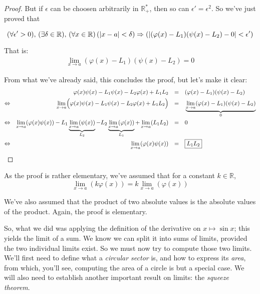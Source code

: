 \documentclass[solutions.tex]{subfiles}
\begin{document}
\begin{proof}
But if $\epsilon$ can be choosen arbitrarily in $\mathbb{R}^*_+$, then
so can $\epsilon'=\epsilon^2$. So we've just proved that

\[ \epsdelta{\epsilon'}{\delta}{a}{x}{(\varphi(x)-L_1)(\psi(x)-L_2)}{0}  \]

That is:
\begin{equation*} \begin{aligned}
	\lim_{x\rightarrow a}(\varphi(x)-L_1)(\psi(x)-L_2) = 0
\end{aligned} \end{equation*}

From what we've already said, this concludes the proof, but let's
make it clear:
\begin{equation*} \begin{aligned}
	~ && \varphi(x)\psi(x)-L_1\psi(x)-L_2\varphi(x)+L_1L_2 &&=\quad&
		(\varphi(x)-L_1)(\psi(x)-L_2) \\
	\Leftrightarrow &&
		\lim_{x\rightarrow a}\Bigl(\varphi(x)\psi(x)-L_1\psi(x)-L_2\varphi(x)+L_1L_2\Bigr) &&=\quad&
		\underbrace{\lim_{x\rightarrow a}(\varphi(x)-L_1)(\psi(x)-L_2)}_0 \\
	\Leftrightarrow &&
		\lim_{x\rightarrow a}(\varphi(x)\psi(x))
		-L_1\underbrace{\lim_{x\rightarrow a}(\psi(x))}_{L_2}
		-L_2\underbrace{\lim_{x\rightarrow a}(\varphi(x))}_{L_1}
		+\lim_{x\rightarrow a}(L_1L_2) &&=\quad& 0 \\
	\Leftrightarrow &&
		\lim_{x\rightarrow a}(\varphi(x)\psi(x)) &&=\quad& \boxed{L_1L_2}
\end{aligned} \end{equation*}
\end{proof}
\begin{remark} As the proof is rather elementary, we've assumed that for a
constant $k\in\mathbb{R}$,
\[
	\lim_{x\rightarrow a}(k\varphi(x))=k\lim_{x\rightarrow a}(\varphi(x))
\]

We've also assumed that the product of two absolute values is the
absolute values of the product. Again, the proof is elementary.
\end{remark}
\hrr

So, what we did was applying the definition of the derivative
on $x\mapsto\sin x$; this yields the limit of a sum. We know we can
split it into sums of limits, provided the two individual limits exist.
So we must now try to compute those two limits. \\

We'll first need to define what a \textit{circular sector} is,
and how to express its \textit{area}, from which, you'll see, computing
the area of a circle is but a special case. We will also need to establish
another important result on limits: the \textit{squeeze theorem}.
\end{document}
